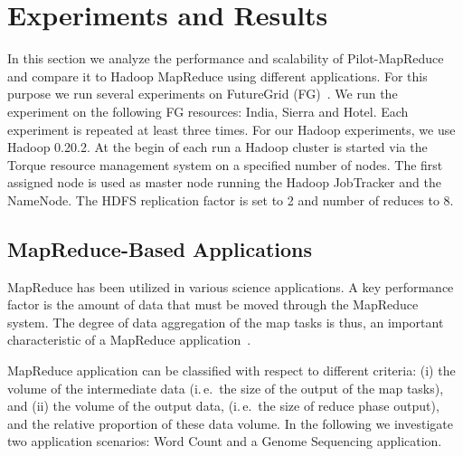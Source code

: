 \documentclass{acm_proc_article-sp}
\newcommand{\upp}{\vspace*{-0.5em}}
\newcommand{\pilotmapreduce}{Pilot-MapReduce\xspace}
\begin{document}
\upp
\section{Experiments and Results}
\label{sec-experiments}


In this section we analyze the performance and scalability of
\pilotmapreduce and compare it to Hadoop MapReduce using different
applications. For this purpose we run several experiments on
FutureGrid (FG)~\cite{fg}. We run the experiment on the following
FG resources: India, Sierra and Hotel. Each experiment is
repeated at least three times. For our Hadoop experiments, we use
Hadoop 0.20.2. At the begin of each run a Hadoop cluster is started
via the Torque resource management system on a specified number of
nodes. The first assigned node is used as master node running the
Hadoop JobTracker and the NameNode. The HDFS replication factor is set
to 2 and number of reduces to 8.
\upp
\subsection{MapReduce-Based Applications}

MapReduce has been utilized in various science applications. A key performance 
factor is the amount of data that must be moved through the MapReduce system. 
The degree of data aggregation of the map tasks is thus, an important 
characteristic of a MapReduce application~\cite{weissman-mr-11}.

MapReduce application can be classified with respect to different
criteria: (i) the volume of the intermediate data (i.\,e.\ the size of
the output of the map tasks), and (ii) the volume of the output data,
(i.\,e.\ the size of reduce phase output), and the relative proportion
of these data volume. In the following we investigate two application
scenarios: Word Count and a Genome Sequencing application.
\end{document}
